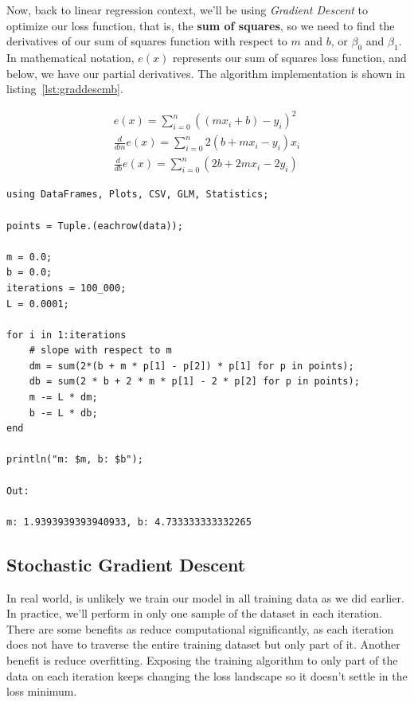 \documentclass[a4paper, 11pt]{article}
\begin{document}
Now, back to linear regression context, we'll be using \textit{Gradient Descent} to optimize our loss function, that is, the \textbf{sum of squares}, so we need to find the derivatives of our sum of squares function with respect to $m$ and $b$, or $\beta_0$ and $\beta_1$. In mathematical notation, $e(x)$ represents our sum of squares loss function, and below, we have our partial derivatives. The algorithm implementation is shown in listing~\ref{lst:graddescmb}. 

\begin{equation}
\begin{aligned}
e(x)=\sum_{i=0}^{n} ((mx_i + b) -y_i)^2 \\[5pt]
\frac{d}{dm}e(x)=\sum_{i=0}^{n}2(b+mx_i - y_i)x_i \\[5pt]
\frac{d}{db}e(x)=\sum_{i=0}^{n}(2b+2mx_i -2y_i)
\end{aligned}
\end{equation}

\begin{lstlisting}[label={lst:graddescmb},caption={Gradient Descent and Linear Regression}]
using DataFrames, Plots, CSV, GLM, Statistics;

points = Tuple.(eachrow(data));

m = 0.0;
b = 0.0;
iterations = 100_000;
L = 0.0001;

for i in 1:iterations
	# slope with respect to m
	dm = sum(2*(b + m * p[1] - p[2]) * p[1] for p in points);
	db = sum(2 * b + 2 * m * p[1] - 2 * p[2] for p in points);
	m -= L * dm;
	b -= L * db;
end

println("m: $m, b: $b");

Out:

m: 1.9393939393940933, b: 4.733333333332265
\end{lstlisting}

\subsection{Stochastic Gradient Descent}
In real world, is unlikely we train our model in all training data as we did earlier. In practice, we'll perform in only one sample of the dataset in each iteration. There are some benefits as reduce computational significantly, as each iteration does not have to traverse the entire training dataset but only part of it. Another benefit is reduce overfitting. Exposing the training algorithm to only part of the data on each iteration keeps changing the loss landscape so it doesn't settle in the loss minimum.
\end{document}
